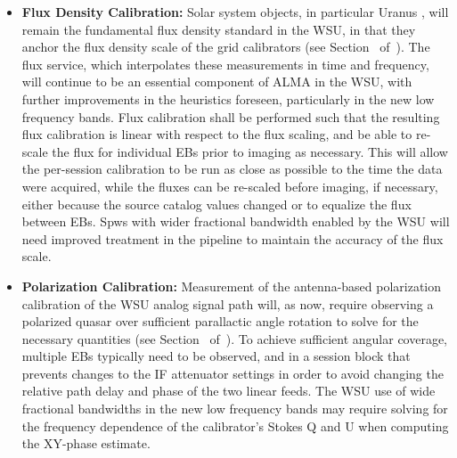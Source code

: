\begin{itemize}
The methods of measuring temporal changes in the antenna-based complex gain (amplitude and phase), via in-band or band-to-band calibration, will continue in the WSU (see Section~\offlineCalibration\/ of~\cite{CSA-IA}).  The improvements in sensitivity, due to the general increase in 
aggregate correlated bandwidth, will likely be traded for selecting gain
calibrators closer to the science target, and thus achieving better overall
removal of atmospheric phase errors while also providing more less sensitivity
to antenna position errors.
\item{\bf Flux Density Calibration:}
Solar system objects, in particular Uranus \cite{c10_thb,Farren2021}, will remain the fundamental flux density standard in the WSU, in that they anchor the flux density scale of the grid calibrators
(see Section~\offlineCalibration\/ of~\cite{CSA-IA}). The flux service, which interpolates these measurements in time and frequency, will continue to be an essential component of ALMA in the WSU, with further improvements in the heuristics foreseen, particularly in the new low frequency bands.  
Flux calibration shall be performed such that the resulting flux calibration is linear with respect to
the flux scaling, and be able to re-scale the flux for individual EBs prior to imaging as necessary.
This will allow the per-session calibration to be run as close as possible to the time the data
were acquired, while the fluxes can be re-scaled before imaging, if necessary, either because the
source catalog values changed or to equalize the flux between EBs.
Spws with wider fractional bandwidth enabled by the WSU will need improved treatment in the pipeline to  maintain the 
accuracy of the flux scale. 
\item{\bf Polarization Calibration:}
Measurement of the antenna-based polarization calibration of the WSU analog signal path will, as now, require observing a polarized quasar over sufficient parallactic angle rotation to solve for the necessary quantities (see Section~\offlineCalibration\/ of~\cite{CSA-IA}).  To achieve sufficient angular coverage, multiple EBs typically need to be observed, and in a session block that prevents changes to the IF attenuator settings in order to avoid changing the relative path delay and phase of the two linear feeds.  The WSU use of wide
fractional bandwidths in the new low frequency bands may require solving
for the frequency dependence of the calibrator’s Stokes Q and U when computing the XY-phase estimate.
\end{itemize}

